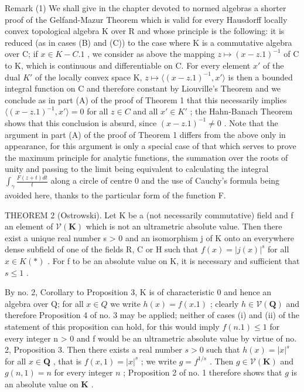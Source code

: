Remark (1) We shall give in the chapter devoted to normed algebras a shorter proof of the Gelfand-Mazur Theorem which is valid for every Hausdorff locally convex topological algebra K over R and whose principle is the following: it is reduced (as in cases (B) and (C)) to the case where K is a commutative algebra over C; if \(x \in K - C.1\) , we consider as above the mapping \(z \mapsto (x - z.1)^{-1}\) of C to K, which is continuous and differentiable on C. For every element \(x'\) of the dual \(K'\) of the locally convex space K, \(z \mapsto \langle(x - z.1)^{-1}, x' \rangle\) is then a bounded integral function on C and therefore constant by Liouville's Theorem and we conclude as in part (A) of the proof of Theorem 1 that this necessarily implies \(\langle(x - z.1)^{-1}, x' \rangle = 0\) for all \(z \in C\) and all \(x' \in K'\) ; the Hahn-Banach Theorem shows that this conclusion is absurd, since \((x - z.1)^{-1} \neq 0\) . Note that the argument in part (A) of the proof of Theorem 1 differs from the above only in appearance, for this argument is only a special case of that which serves to prove the maximum principle for analytic functions, the summation over the roots of unity and passing to the limit being equivalent to calculating the integral \(\int_{\gamma} \frac{F(z + t) dt}{t}\) along a circle of centre 0 and the use of Cauchy's formula being avoided here, thanks to the particular form of the function F.

THEOREM 2 (Ostrowski). Let K be a (not necessarily commutative) field and f an element of \(\mathcal{V}(\mathbf{K})\) which is not an ultrametric absolute value. Then there exist a unique real number s > 0 and an isomorphism j of K onto an everywhere dense subfield of one of the fields R, C or H such that \(f(x) = |j(x)|^{s}\) for all \(x \in K (*)\) . For f to be an absolute value on K, it is necessary and sufficient that \(s \leqslant 1\) .

By no. 2, Corollary to Proposition 3, K is of characteristic 0 and hence an algebra over Q; for all \(x \in Q\) we write \(h(x) = f(x.1)\) ; clearly \(h \in \mathcal{V}(\mathbf{Q})\) and therefore Proposition 4 of no. 3 may be applied; neither of cases (i) and (ii) of the statement of this proposition can hold, for this would imply \(f(n.1) \leqslant 1\) for every integer n > 0 and f would be an ultrametric absolute value by virtue of no. 2, Proposition 3. Then there exists a real number \(s > 0\) such that \(h(x) = |x|^s\) for all \(x \in \mathbf{Q}\) , that is \(f(x,1) = |x|^s\) ; we write \(g = f^{1 / s}\) . Then \(g \in \mathcal{V}(\mathbf{K})\) and \(g(n,1) = n\) for every integer \(n\) ; Proposition 2 of no. 1 therefore shows that \(g\) is an absolute value on \(\mathbf{K}\) .

